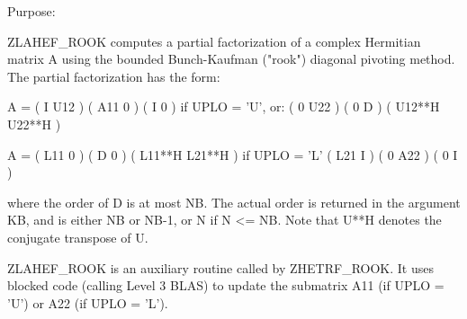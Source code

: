  

\begin{DoxyParagraph}{Purpose\+: }
\begin{DoxyVerb} ZLAHEF_ROOK computes a partial factorization of a complex Hermitian
 matrix A using the bounded Bunch-Kaufman ("rook") diagonal pivoting
 method. The partial factorization has the form:

 A  =  ( I  U12 ) ( A11  0  ) (  I      0     )  if UPLO = 'U', or:
       ( 0  U22 ) (  0   D  ) ( U12**H U22**H )

 A  =  ( L11  0 ) (  D   0  ) ( L11**H L21**H )  if UPLO = 'L'
       ( L21  I ) (  0  A22 ) (  0      I     )

 where the order of D is at most NB. The actual order is returned in
 the argument KB, and is either NB or NB-1, or N if N <= NB.
 Note that U**H denotes the conjugate transpose of U.

 ZLAHEF_ROOK is an auxiliary routine called by ZHETRF_ROOK. It uses
 blocked code (calling Level 3 BLAS) to update the submatrix
 A11 (if UPLO = 'U') or A22 (if UPLO = 'L').\end{DoxyVerb}
 
\end{DoxyParagraph}


